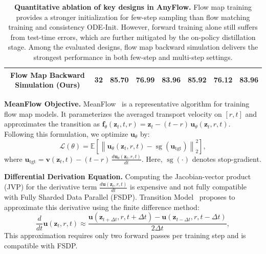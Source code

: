 \documentclass{llmxive}
\providecommand{\myPara}[1]{\noindent\textbf{#1}}
\begin{document}
\begin{table}[!tb]
{\begin{tabular}{c|c|ccc|ccc}
        \rowcolor{mitblue}Flow Map Backward Simulation (Ours) & 32 & \textbf{85.70} & \textbf{76.99} & \textbf{83.96} & \textbf{85.92} & \textbf{76.12} & \textbf{83.96} \\
        \bottomrule
        \end{tabular}}    \caption{\textbf{Quantitative ablation of key designs in AnyFlow.}
        Flow map training provides a stronger initialization for few-step sampling than flow matching training and consistency ODE-Init. However, forward training alone still suffers from test-time errors, which are further mitigated by the on-policy distillation stage. Among the evaluated designs, flow map backward simulation delivers the strongest performance in both few-step and multi-step settings.
      }
    \label{tab:ablation_anyflow}
\end{table}


\myPara{MeanFlow Objective.}
MeanFlow~\cite{geng2025mean} is a representative algorithm for training flow map models. It parameterizes the averaged transport velocity on $[r,t]$ and approximates the transition as $\mathbf{f}_\theta(\mathbf{z}_t,t,r)=\mathbf{z}_t-(t-r)\,\mathbf{u}_\theta(\mathbf{z}_t,r,t)$. Following this formulation, we optimize $\mathbf{u}_\theta$ by:
\begin{equation}
  \label{eq:meanflow}
  \mathcal{L}(\theta)
  = \mathbb{E}\left[\left\|\mathbf{u}_\theta(\mathbf{z}_t, r, t)-\operatorname{sg}\!\left(\mathbf{u}_{\text{tgt}}\right)\right\|_2^2\right],
\end{equation}
where $\mathbf{u}_{\text{tgt}}=\mathbf{v}(\mathbf{z}_t,t) - (t-r)\,\frac{d\mathbf{u}_\theta(\mathbf{z}_t,r,t)}{dt}$.
Here, $\operatorname{sg}(\cdot)$ denotes stop-gradient.

\myPara{Differential Derivation
Equation.} Computing the Jacobian-vector product (JVP) for the derivative term $\frac{d\mathbf{u}(\mathbf{z}_t, r, t)}{dt}$ is expensive and not fully compatible with Fully Sharded Data Parallel (FSDP). Transition Model~\cite{wang2025transition} proposes to approximate this derivative using the finite difference method:
\begin{equation}
    \label{eq:center_difference}
  \frac{d}{dt}\mathbf{u}(\mathbf{z}_t, r, t) \approx \frac{\mathbf{u}(\mathbf{z}_{t+\Delta t}, r, t+\Delta t) - \mathbf{u}(\mathbf{z}_{t-\Delta t}, r, t-\Delta t)}{2\Delta t},
\end{equation}
This approximation requires only two forward passes per training step and is compatible with FSDP.
\end{document}
